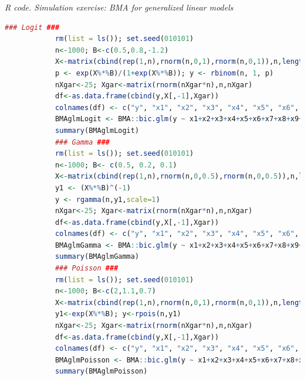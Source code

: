 \begin{tcolorbox}[enhanced,width=4.67in,center upper,
	fontupper=\large\bfseries,drop shadow southwest,sharp corners]
	\textit{R code. Simulation exercise: BMA for generalized linear models}
	\begin{VF}
		\begin{lstlisting}[language=R]
			### Logit ###
			rm(list = ls()); set.seed(010101)
			n<-1000; B<-c(0.5,0.8,-1.2)
			X<-matrix(cbind(rep(1,n),rnorm(n,0,1),rnorm(n,0,1)),n,length(B))
			p <- exp(X%*%B)/(1+exp(X%*%B)); y <- rbinom(n, 1, p)
			nXgar<-25; Xgar<-matrix(rnorm(nXgar*n),n,nXgar)
			df<-as.data.frame(cbind(y,X[,-1],Xgar))
			colnames(df) <- c("y", "x1", "x2", "x3", "x4", "x5", "x6", "x7", "x8", "x9", "x10", "x11", "x12", "x13", "x14", "x15", "x16", "x17", "x18", "x19", "x20", "x21", "x22", "x23", "x24", "x25", "x26", "x27")
			BMAglmLogit <- BMA::bic.glm(y ~ x1+x2+x3+x4+x5+x6+x7+x8+x9+x10+x11+x12+x13+x14+x15+x16+x17+x18+x19+x20+x21+x22+x23+x24+x25+x26+x27, data = df, glm.family = binomial(link="logit"), strict = FALSE, OR = 50)
			summary(BMAglmLogit)
			### Gamma ###
			rm(list = ls()); set.seed(010101)
			n<-1000; B<- c(0.5, 0.2, 0.1)
			X<-matrix(cbind(rep(1,n),rnorm(n,0,0.5),rnorm(n,0,0.5)),n,length(B))
			y1 <- (X%*%B)^(-1)
			y <- rgamma(n,y1,scale=1)
			nXgar<-25; Xgar<-matrix(rnorm(nXgar*n),n,nXgar)
			df<-as.data.frame(cbind(y,X[,-1],Xgar))
			colnames(df) <- c("y", "x1", "x2", "x3", "x4", "x5", "x6", "x7", "x8", "x9", "x10", "x11", "x12", "x13", "x14", "x15", "x16", "x17", "x18", "x19", "x20", "x21", "x22", "x23", "x24", "x25", "x26", "x27")
			BMAglmGamma <- BMA::bic.glm(y ~ x1+x2+x3+x4+x5+x6+x7+x8+x9+x10+x11+x12+x13+x14+x15+x16+x17+x18+x19+x20+x21+x22+x23+x24+x25+x26+x27, data = df, glm.family = Gamma(link="inverse"), strict = FALSE, OR = 50)
			summary(BMAglmGamma)
			### Poisson ###
			rm(list = ls()); set.seed(010101)
			n<-1000; B<-c(2,1.1,0.7)
			X<-matrix(cbind(rep(1,n),rnorm(n,0,1),rnorm(n,0,1)),n,length(B))
			y1<-exp(X%*%B); y<-rpois(n,y1)
			nXgar<-25; Xgar<-matrix(rnorm(nXgar*n),n,nXgar)
			df<-as.data.frame(cbind(y,X[,-1],Xgar))
			colnames(df) <- c("y", "x1", "x2", "x3", "x4", "x5", "x6", "x7", "x8", "x9", "x10", "x11", "x12", "x13", "x14", "x15", "x16", "x17", "x18", "x19", "x20", "x21", "x22", "x23", "x24", "x25", "x26", "x27")
			BMAglmPoisson <- BMA::bic.glm(y ~ x1+x2+x3+x4+x5+x6+x7+x8+x9+x10+x11+x12+x13+x14+x15+x16+x17+x18+x19+x20+x21+x22+x23+x24+x25+x26+x27, data = df, glm.family = poisson(link="log"), strict = FALSE, OR = 50)
			summary(BMAglmPoisson)
		\end{lstlisting}
	\end{VF}
\end{tcolorbox} 


